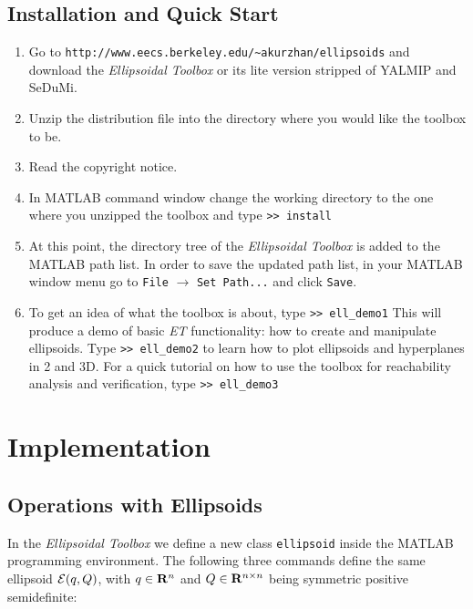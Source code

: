 \documentclass{report}
\newcommand{\EE}{{\cal E}}
\begin{document}
\section{Installation and Quick Start}
\begin{enumerate}
\item Go to
\newline
{\tt http://www.eecs.berkeley.edu/\~{ }akurzhan/ellipsoids}
\newline
and download the {\it Ellipsoidal Toolbox} or its lite version stripped
of YALMIP and SeDuMi.
\item Unzip the distribution file into the directory where you would like
the toolbox to be.
\item Read the copyright notice.
\item In MATLAB command window change the working directory to the one where
you unzipped the toolbox and type
\newline
{\tt >> install}
\item At this point, the directory tree of the {\it Ellipsoidal Toolbox} is
added to the MATLAB path list. In order to save the updated path list,
in your MATLAB window menu go to {\tt File} $\rightarrow$ {\tt Set Path...} and
click {\tt Save}.
\item To get an idea of what the toolbox is about, type
\newline
{\tt >> ell\_demo1}
\newline
This will produce a demo of basic {\it ET} functionality: how to create
and manipulate ellipsoids.
\newline
Type
\newline
{\tt >> ell\_demo2}
\newline
to learn how to plot ellipsoids and hyperplanes in 2 and 3D.
\newline
For a quick tutorial on how to use the toolbox for reachability analysis
and verification, type
\newline
{\tt >> ell\_demo3}
\end{enumerate}





\chapter{Implementation}
\section{Operations with Ellipsoids}
In the {\it Ellipsoidal Toolbox} we define a new class {\tt ellipsoid} inside
the MATLAB programming environment. The following three commands
define the same ellipsoid $\EE(q,Q)$, with $q\in{\bf R}^n$ and
$Q\in{\bf R}^{n\times n}$ being symmetric positive semidefinite:
\end{document}
